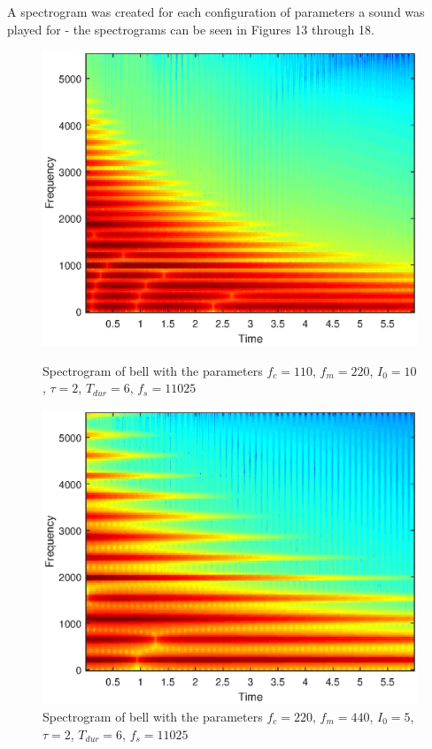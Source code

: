 \documentclass{article}
\begin{document}
\newpage
A spectrogram was created for each configuration of parameters a sound was played for - the spectrograms can be seen in Figures 13 through 18.
\begin{figure}[H]
	\centering
	\begin{minipage}{0.3\linewidth}
		\includegraphics[scale=0.3]{spec1}
		\caption{Spectrogram of bell with the parameters $f_c = 110$, $f_m = 220$, $I_0 = 10$, $\tau = 2$, $T_{dur} = 6$, $f_s = 11025$}
	\end{minipage}
	\hspace{4cm}
	\begin{minipage}{0.3\linewidth}
		\includegraphics[scale=0.3]{spec2}
		\caption{Spectrogram of bell with the parameters $f_c = 220$, $f_m = 440$, $I_0 = 5$, $\tau = 2$, $T_{dur} = 6$, $f_s = 11025$}
	\end{minipage}
\end{figure}
\end{document}
